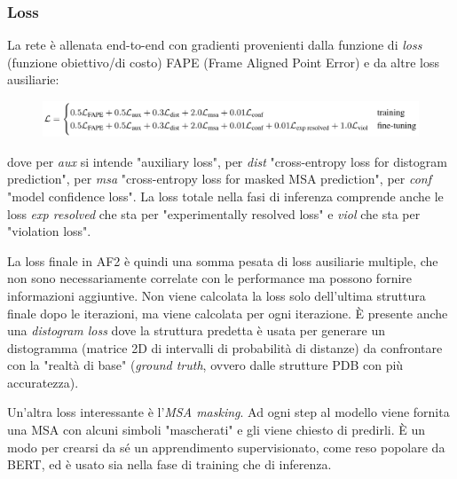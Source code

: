 \subsubsection{Loss}

La rete è allenata end-to-end con gradienti provenienti dalla funzione di \textit{loss} (funzione obiettivo/di costo) FAPE (Frame Aligned Point Error) e da altre loss ausiliarie:

\begin{figure}[!htb]
	\centering
	\includegraphics[scale=0.4]{images/loss.png}
	\label{fig:loss}
\end{figure}

dove per \textit{aux} si intende "auxiliary loss", per \textit{dist} "cross-entropy loss for distogram prediction", per \textit{msa} "cross-entropy loss for masked MSA prediction", per \textit{conf} "model confidence loss". La loss totale nella fasi di inferenza comprende anche le loss \textit{exp resolved} che sta per "experimentally resolved loss" e \textit{viol} che sta per "violation loss".\\

\par La loss finale in AF2 è quindi una somma pesata di loss ausiliarie multiple, che non sono necessariamente correlate con le performance ma possono fornire informazioni aggiuntive. Non viene calcolata la loss solo dell'ultima struttura finale dopo le iterazioni, ma viene calcolata per ogni iterazione. È presente anche una \textit{distogram loss} dove la struttura predetta è usata per generare un distogramma (matrice 2D di intervalli di probabilità di distanze) da confrontare con la "realtà di base" (\textit{ground truth}, ovvero dalle strutture PDB con più accuratezza).

\par Un'altra loss interessante è l'\textit{MSA masking}. Ad ogni step al modello viene fornita una MSA con alcuni simboli "mascherati" e gli viene chiesto di predirli. È un modo per crearsi da sé un apprendimento supervisionato, come reso popolare da BERT, ed è usato sia nella fase di training che di inferenza.\\

